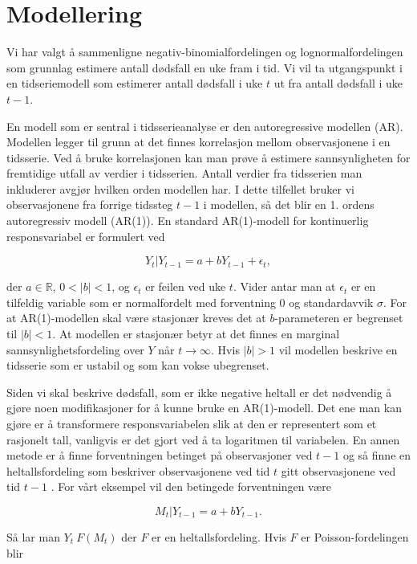 \section{Modellering}

Vi har valgt å sammenligne negativ-binomialfordelingen og lognormalfordelingen
som grunnlag estimere antall dødsfall en uke fram i tid. Vi vil ta utgangspunkt
i en tidseriemodell som estimerer antall dødsfall i uke $t$ ut fra antall
dødsfall i uke $t-1$. 

En modell som er sentral i tidsserieanalyse er den autoregressive modellen (AR).
Modellen legger til grunn at det finnes korrelasjon mellom observasjonene i
en tidsserie. Ved å bruke korrelasjonen kan man prøve å estimere
sannsynligheten for fremtidige utfall av verdier i tidsserien. Antall verdier
fra tidsserien man inkluderer avgjør hvilken orden modellen har. I dette
tilfellet bruker vi observasjonene fra forrige tidssteg $t-1$ i modellen, så
det blir en 1. ordens autoregressiv modell (AR(1)). En standard AR(1)-modell
for kontinuerlig responsvariabel er formulert ved  

$$
Y_t|Y_{t-1} = a + bY_{t-1} + \epsilon_t,
$$

\noindent
der $a \in \mathbb{R}$, $0 < |b| <1$, og $\epsilon_t$ er feilen ved uke $t$.
Vider antar man at $\epsilon_t$ er en tilfeldig variable som er normalfordelt
med forventning 0 og standardavvik $\sigma$. For at AR(1)-modellen skal være
stasjonær kreves det at $b$-parameteren er begrenset til $|b| < 1$. At modellen
er stasjonær betyr at det finnes en marginal sannsynlighetsfordeling over $Y$
når $t \to \infty$. Hvis $|b| > 1$ vil modellen beskrive en tidsserie som er
ustabil og som kan vokse ubegrenset. 

Siden vi skal beskrive dødsfall, som er ikke negative heltall er det nødvendig
å gjøre noen modifikasjoner for å kunne bruke en AR(1)-modell. Det ene man kan
gjøre er å transformere responsvariabelen slik at den er representert som et
rasjonelt tall, vanligvis er det gjort ved å ta logaritmen til variabelen. En
annen metode er å finne forventningen betinget på observasjoner ved $t-1$ og så
finne en heltallsfordeling som beskriver observasjonene ved tid $t$ gitt
observasjonene ved tid $t-1$ \parencite[73]{weiss2018introduction}. For vårt eksempel vil den betingede forventningen
være 

$$
M_t|Y_{t-1} = a +bY_{t-1}.
$$

\noindent
Så lar man $Y_t ~ F(M_t)$ der $F$ er en heltallsfordeling. Hvis $F$ er
Poisson-fordelingen blir  

